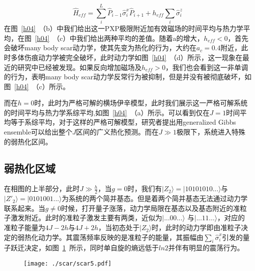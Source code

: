 \begin{equation}
\hat{H}_{eff} = \sum_{i}^{L} \hat{P}_{i-1}\hat{\sigma}_i^x\hat{P}_{i+1} + h_{eff}\sum_i\hat{\sigma}^z_i 
\end{equation}
在图~\ref{h04}~（b）中我们给出这一PXP极限附近加有效磁场的时间平均与热力学平均，在图~\ref{h04}~（c）中我们给出两种平均的差值。随着a的增大，$h_{eff}<0$，首先会破坏many body scar动力学，使其先变为热化的行为，大约在$a_c=0.4$附近，此时多体伤痕动力学被完全破坏，此时动力学如图~\ref{h04}~（d）所示，这一现象在最近的研究中已经被发现\cite{Yao2022quantum}。如果反向增加磁场及$h_{eff}>0$，我们也会看到这一非单调的行为，表明many body scar动力学反常行为被抑制，但是并没有被彻底破坏，如图~\ref{h04}~（c）所示。

而在$h=0$时，此时为严格可解的横场伊辛模型，此时我们展示这一严格可解系统的时间平均与热力学系综平均,如图~\ref{h04}~（a）所示。可以看到仅在$J=1$时间平均等于系综平均，对于这样的严格可解模型，研究者提出用generalized Gibbs ensemble可以给出整个$J$区间的广义热化预测\cite{vidmar2016generalized}。而在$J\gg 1$极限下，系统进入特殊的弱热化区间。



\subsection{弱热化区域}
在相图的上半部分，此时$J \gg \frac{h}{2}$，当$g=0$时，我们有$|Z_2\rangle=|10101010...\rangle$与$|Z'_{2}\rangle=|0101001...\rangle$为系统的两个简并基态。但是着两个简并基态无法通过动力学联系起来。当$g\neq 0$时候，打开量子涨落，动力学局限在基态以及基态附近的准粒子激发附近。此时的准粒子激发主要有两类，近似为$|...00...\rangle$
与$|...11...\rangle$，对应的准粒子能量为$4J-2h$与$4J+2h$，当初态处于$|Z_2\rangle$时，此时的动力学即由准粒子决定的弱热化动力学。其震荡频率反映的是准粒子的能量，其振幅由$\sum_i \hat{\sigma}_i^x$引发的量子跃迁决定，如图~\ref{weak}~所示，同时单自旋的熵远低于$ln2$并伴有明显的震荡行为。
\begin{figure}[h]
\centering
\texttt{[image: ./scar/scar5.pdf]}
\label{weak}
\end{figure}

